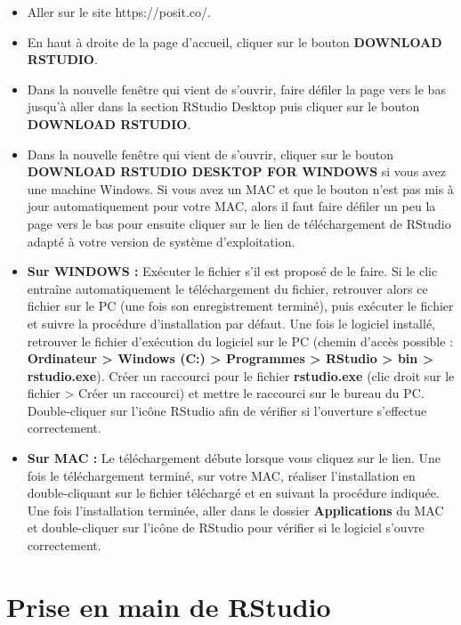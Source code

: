 \documentclass[
  letterpaper,
]{book}
\providecommand{\tightlist}{%
  \setlength{\itemsep}{0pt}\setlength{\parskip}{0pt}}\usepackage{longtable,booktabs,array}
\begin{document}
\begin{itemize}
\tightlist
\item
  Aller sur le site https://posit.co/.
\item
  En haut à droite de la page d'accueil, cliquer sur le bouton
  \textbf{DOWNLOAD RSTUDIO}.
\item
  Dans la nouvelle fenêtre qui vient de s'ouvrir, faire défiler la page
  vers le bas jusqu'à aller dans la section RStudio Desktop puis cliquer
  sur le bouton \textbf{DOWNLOAD RSTUDIO}.
\item
  Dans la nouvelle fenêtre qui vient de s'ouvrir, cliquer sur le bouton
  \textbf{DOWNLOAD RSTUDIO DESKTOP FOR WINDOWS} si vous avez une machine
  Windows. Si vous avez un MAC et que le bouton n'est pas mis à jour
  automatiquement pour votre MAC, alors il faut faire défiler un peu la
  page vers le bas pour ensuite cliquer sur le lien de téléchargement de
  RStudio adapté à votre version de système d'exploitation.
\item
  \textbf{Sur WINDOWS :} Exécuter le fichier s'il est proposé de le
  faire. Si le clic entraîne automatiquement le téléchargement du
  fichier, retrouver alors ce fichier sur le PC (une fois son
  enregistrement terminé), puis exécuter le fichier et suivre la
  procédure d'installation par défaut. Une fois le logiciel installé,
  retrouver le fichier d'exécution du logiciel sur le PC (chemin d'accès
  possible : \textbf{Ordinateur \textgreater{} Windows (C:)
  \textgreater{} Programmes \textgreater{} RStudio \textgreater{} bin
  \textgreater{} rstudio.exe}). Créer un raccourci pour le fichier
  \textbf{rstudio.exe} (clic droit sur le fichier \textgreater{} Créer
  un raccourci) et mettre le raccourci sur le bureau du PC.
  Double-cliquer sur l'icône RStudio afin de vérifier si l'ouverture
  s'effectue correctement.
\item
  \textbf{Sur MAC :} Le téléchargement débute lorsque vous cliquez sur
  le lien. Une fois le téléchargement terminé, sur votre MAC, réaliser
  l'installation en double-cliquant sur le fichier téléchargé et en
  suivant la procédure indiquée. Une fois l'installation terminée, aller
  dans le dossier \textbf{Applications} du MAC et double-cliquer sur
  l'icône de RStudio pour vérifier si le logiciel s'ouvre correctement.
\end{itemize}

\section{Prise en main de RStudio}\label{prise-en-main-de-rstudio}
\end{document}
